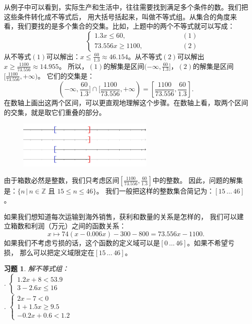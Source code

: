 \documentclass[12pt,UTF8]{ctexbook}
\newtheorem{xt}{习题}[section]
\begin{document}
从例子中可以看到，实际生产和生活中，往往需要找到满足多个条件的数。我们把这些条件转化成不等式后，
用大括号括起来，叫做不等式组。从集合的角度来看，我们要找的是多个集合的交集。比如，上题中的两个不等式就可以写成：
$$ \quad \quad \quad \quad \quad\left\{
\begin{array}{cr}
    1.3x \leqslant 60, & \quad \quad \quad \quad \quad (1) \\
    73.556x \geqslant 1100, & \quad \quad \quad \quad \quad (2)
\end{array}\right.
$$
从不等式$(1)$可以解出：$x \leqslant \frac{60}{1.3} \approx 46.154$。从不等式$(2)$可以解出$x \geqslant \frac{1100}{73.556} \approx 14.955$。
所以，$(1)$的解集是区间$(-\infty, \frac{60}{1.3}]$，$(2)$的解集是区间$[\frac{1100}{73.556}, +\infty)$。
它们的交集是：
$$(-\infty, \frac{60}{1.3}] \cap [\frac{1100}{73.556}, +\infty)  = [\frac{1100}{73.556}, \frac{60}{1.3}]. $$
在数轴上画出这两个区间，可以更直观地理解这个步骤。在数轴上看，取两个区间的交集，就是取它们重叠的部分。

\begin{figure}[H] %
    \vspace{8pt}
    \centering
    \includegraphics[width=0.6\textwidth]{一元一次不等式组1.png}
\end{figure}

由于箱数必然是整数，我们只考虑区间$[\frac{1100}{73.556}, \frac{60}{1.3}]$中的整数。
因此，问题的解集是：$\{n \, | \, n \in \mathbb{Z} \mbox{ 且 }15 \leqslant n \leqslant 46\}$。
我们一般把这样的整数集合简记为：$[15 \, \ldots \, 46]$。

如果我们想知道每次运输到海外销售，获利和数量的关系是怎样的，
我们可以建立箱数和利润（万元）之间的函数关系：
$$ x \mapsto 74 (x - 0.006x) - 300 - 800 = 73.556 x - 1100. $$
如果我们不考虑亏损的话，这个函数的定义域可以是$[0 \, \ldots \, 46]$。如果不希望亏损，
那么可以把定义域限定在$[15 \, \ldots \, 46]$。

\begin{xt}\label{xt:5-5-0}
    解不等式组：\\
    . $\left\{
        \begin{array}{cr}
            1.2x + 8 < 53.9 \\
            3 - 2.6x \leqslant 16 
        \end{array}\right.$ \\
    . $\left\{
        \begin{array}{cr}
            2x - 7 < 0 \\
            1 + 1.5x \geqslant 9.5 \\
            -0.2x + 0.6 < 1.2 
        \end{array}\right.$ 
\end{xt}
\end{document}
